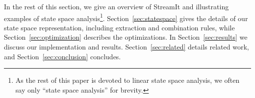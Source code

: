 In the rest of this section, we give an overview of StreamIt and
illustrating examples of state space analysis\footnote{As the rest of
this paper is devoted to linear state space analysis, we often say
only ``state space analysis'' for brevity.}.
Section~\ref{sec:statespace} gives the details of our state space
representation, including extraction and combination rules, while
Section~\ref{sec:optimization} describes the optimizations.  In
Section~\ref{sec:results} we discuss our implementation and results.
Section~\ref{sec:related} details related work, and
Section~\ref{sec:conclusion} concludes.








